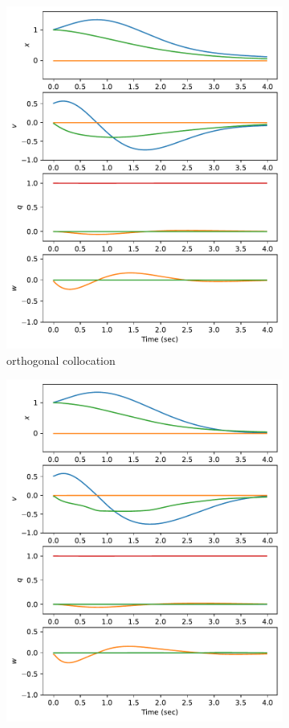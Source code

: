 \documentclass[]{article}
\begin{document}
\begin{figure}[H]
\begin{subfigure}[b]{0.3\textwidth}
		\includegraphics[width=\textwidth]{figures/statex1z1vx1.pdf}
		\caption{orthogonal collocation}
	\end{subfigure}%
	\begin{subfigure}[b]{0.3\textwidth}
		\centering
		\includegraphics[width=\textwidth]{figures/statex1z1vx2.pdf}

\end{subfigure}
\end{figure}
\end{document}
